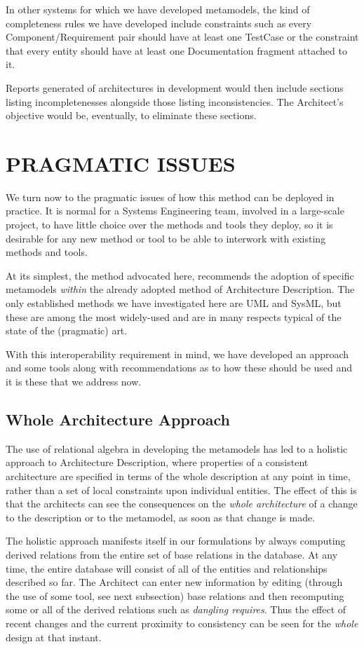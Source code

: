 \documentclass[a4paper,twoside]{article}
\begin{document}
In other systems for which we have developed metamodels, the kind of 
completeness rules we have developed include constraints such as every Component/Requirement pair should have at least one TestCase or the constraint that every entity should have at least one Documentation fragment attached to it. 

Reports generated of architectures in development would then include sections listing incompletenesses alongside those listing inconsistencies. The Architect's objective would be, eventually, to eliminate these sections.


\section{\uppercase{Pragmatic Issues}}
\label{sec:pragmatics}
\noindent We turn now to the pragmatic issues of how this method can be deployed in practice. It is normal for a Systems Engineering team, involved in a large-scale project, to have little choice over the methods and tools they deploy, so it is desirable for any new method or tool to be able to interwork with existing methods and tools.

At its simplest, the method advocated here, recommends the adoption of specific metamodels {\em within} the already adopted method of Architecture Description. The only established methods we have investigated here are UML and SysML, but these are among the most widely-used and are in many respects typical of the state of the (pragmatic) art. 

With this interoperability requirement in mind, we have developed an approach and some tools along with recommendations as to how these should be used and it is these that we address now.

\subsection{Whole Architecture Approach}
\noindent The use of relational algebra in developing the metamodels has led to a holistic approach to Architecture Description, where properties of a consistent architecture are specified in terms of the whole description at any point in time, rather than a set of local constraints upon individual entities. The effect of this is that the architects can see the consequences on the {\em whole architecture} of a change to the description or to the metamodel, as soon as that change is made. 

The holistic approach manifests itself in our formulations by always computing derived relations from the entire set of base relations in the database. At any time, the entire database will consist of all of the entities and relationships described so far. The Architect can enter new information by editing (through the use of some tool, see next subsection) base relations and then recomputing some or all of the derived relations such as {\em dangling requires}. Thus the effect of recent changes and the current proximity to consistency can be seen for the {\em whole} design at that instant.
\end{document}
